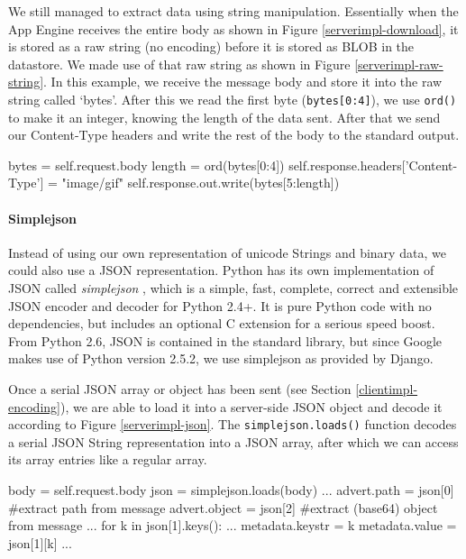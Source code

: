 We still managed to extract data using string manipulation. Essentially when the
App Engine receives the entire body as shown in Figure \ref{serverimpl-download},
it is stored as a raw string (no encoding) before it is stored as BLOB in the
datastore. We made use of that raw string as shown in Figure
\ref{serverimpl-raw-string}. In this example, we receive the message body and
store it into the raw string called `bytes'. After this we read the first byte
(\texttt{bytes[0:4]}), we use \texttt{ord()} to make it an integer, knowing the
length of the data sent. After that we send our Content-Type headers and write
the rest of the body to the standard output.

\begin{figure*}[ht] %
\begin{center}
\begin{code}
bytes = self.request.body
length = ord(bytes[0:4])
self.response.headers['Content-Type'] = "image/gif"
self.response.out.write(bytes[5:length])
\end{code}
\caption{Manipulating a Raw String.\label{serverimpl-raw-string}}
\end{center}
\end{figure*}

\paragraph{Simplejson}
\label{serverimpl-simplejson}
Instead of using our own representation of unicode Strings and binary data, we
could also use a JSON representation. Python has its own implementation of
JSON called \emph{simplejson} \cite{simplejson-www}, which is a
simple, fast, complete, correct and extensible JSON encoder and decoder for
Python 2.4+. It is pure Python code with no dependencies, but includes an
optional C extension for a serious speed boost. From Python 2.6, JSON is
contained in the standard library, but since Google makes use of Python version
2.5.2, we use simplejson as provided by Django. 

Once a serial JSON array or object has been sent (see Section
\ref{clientimpl-encoding}), we are able to load it into a server-side JSON
object and decode it according to Figure \ref{serverimpl-json}. The
\texttt{simplejson.loads()} function decodes a serial JSON String representation
into a JSON array, after which we can access its array entries like a regular
array.

\begin{figure*}[ht] %
\begin{center}
\begin{code}
body = self.request.body
json = simplejson.loads(body)
...
advert.path   = json[0] #extract path from message
advert.object = json[2] #extract (base64) object from message
...
for k in json[1].keys():
  ...
  metadata.keystr = k
  metadata.value  = json[1][k]
...
\end{code}
\caption{Decoding a JSON object.\label{serverimpl-json}}
\end{center}
\end{figure*}

